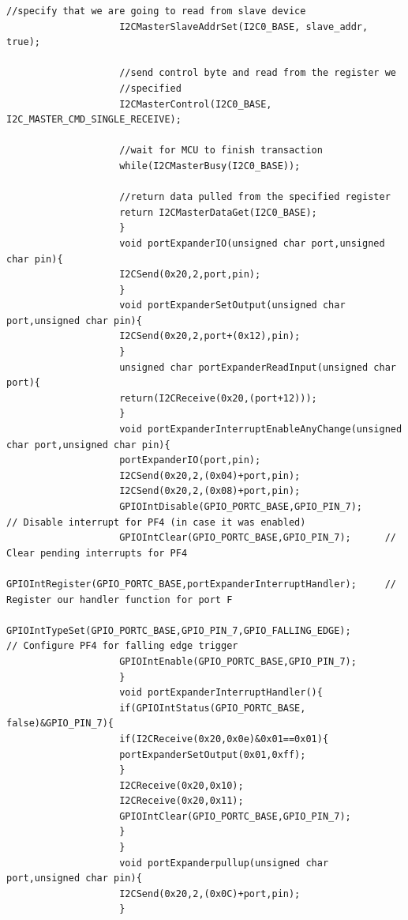 \documentclass[a4paper,12pt,oneside]{article}
\begin{document}
\begin{lstlisting}[style=CStyle]
					//specify that we are going to read from slave device
					I2CMasterSlaveAddrSet(I2C0_BASE, slave_addr, true);
					
					//send control byte and read from the register we
					//specified
					I2CMasterControl(I2C0_BASE, I2C_MASTER_CMD_SINGLE_RECEIVE);
					
					//wait for MCU to finish transaction
					while(I2CMasterBusy(I2C0_BASE));
					
					//return data pulled from the specified register
					return I2CMasterDataGet(I2C0_BASE);
					}
					void portExpanderIO(unsigned char port,unsigned char pin){
					I2CSend(0x20,2,port,pin);
					}
					void portExpanderSetOutput(unsigned char port,unsigned char pin){
					I2CSend(0x20,2,port+(0x12),pin);
					}
					unsigned char portExpanderReadInput(unsigned char port){
					return(I2CReceive(0x20,(port+12)));
					}
					void portExpanderInterruptEnableAnyChange(unsigned char port,unsigned char pin){
					portExpanderIO(port,pin);
					I2CSend(0x20,2,(0x04)+port,pin);
					I2CSend(0x20,2,(0x08)+port,pin);
					GPIOIntDisable(GPIO_PORTC_BASE,GPIO_PIN_7);        // Disable interrupt for PF4 (in case it was enabled)
					GPIOIntClear(GPIO_PORTC_BASE,GPIO_PIN_7);      // Clear pending interrupts for PF4
					GPIOIntRegister(GPIO_PORTC_BASE,portExpanderInterruptHandler);     // Register our handler function for port F
					GPIOIntTypeSet(GPIO_PORTC_BASE,GPIO_PIN_7,GPIO_FALLING_EDGE);             // Configure PF4 for falling edge trigger
					GPIOIntEnable(GPIO_PORTC_BASE,GPIO_PIN_7);
					}
					void portExpanderInterruptHandler(){
					if(GPIOIntStatus(GPIO_PORTC_BASE, false)&GPIO_PIN_7){
					if(I2CReceive(0x20,0x0e)&0x01==0x01){
					portExpanderSetOutput(0x01,0xff);
					}
					I2CReceive(0x20,0x10);
					I2CReceive(0x20,0x11);
					GPIOIntClear(GPIO_PORTC_BASE,GPIO_PIN_7);
					}
					}
					void portExpanderpullup(unsigned char port,unsigned char pin){
					I2CSend(0x20,2,(0x0C)+port,pin);
					}
					
				\end{lstlisting}
\end{document}
